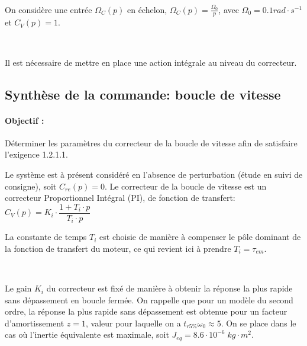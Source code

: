 ~\

On considère une entrée $\Omega_C(p)$ en échelon, $\Omega_C(p)=\frac{\Omega_0}{p}$, avec $\Omega_0=0.1rad\cdot s^{-1}$ et $C_V(p)=1$. 


~\

Il est nécessaire de mettre en place une action intégrale au niveau du correcteur.

\subsection{Synthèse de la commande: boucle de vitesse}

\paragraph{Objectif :} Déterminer les paramètres du correcteur de la boucle de vitesse afin de satisfaire l'exigence 1.2.1.1. 

Le système est à présent considéré en l'absence de perturbation (étude en suivi de consigne), soit $C_{re}(p)=0$. Le correcteur de la boucle de vitesse est un correcteur Proportionnel Intégral (PI), de fonction de transfert:
$C_V(p)=K_i\cdot \dfrac{1+T_i\cdot p}{T_i\cdot p}$

La constante de temps $T_i$ est choisie de manière à compenser le pôle dominant de la fonction de transfert du moteur, ce qui revient ici à prendre $T_i=\tau_{em}$.


~\

Le gain $K_i$ du correcteur est fixé de manière à obtenir la réponse la plus rapide sans dépassement en boucle fermée. On rappelle que pour un modèle du second ordre, la réponse la plus rapide sans dépassement est obtenue pour un facteur d'amortissement $z=1$, valeur pour laquelle on a $t_{r5\%}\omega_0 \approx 5$. On se place dans le cas où l'inertie équivalente est maximale, soit $J_{eq}=8.6 \cdot 10^{-6}\;kg \cdot m^2$.

